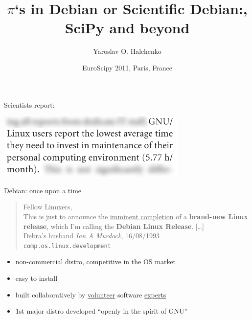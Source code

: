 \documentclass[]{beamer}
\title[$\pi$`s in Debian]%
{$\pi$`s in Debian or Scientific Debian:\newline {NumPy}, {SciPy} and beyond
}
\author[Halchenko]{Yaroslav O. Halchenko}
\institute[Debian, Dartmouth]{Debian Project,\newline Dartmouth College, USA}
\date[EuroScipy 2011]{EuroScipy 2011, Paris, France}
\begin{document}
{\SWIRLBG
\begin{frame}
  \titlepage
\end{frame}
}

\begin{frame}
\thispagestyle{empty}

Scientists report:
\begin{center}
    \includegraphics[width=0.7\textwidth]{neurolinux_paper_mainttime}\\
    {\begin{tiny}
    \end{tiny}}
\end{center}
\end{frame}

\begin{frame}{Debian: once upon a time}
  \begin{quotation}
    \noindent Fellow Linuxers,\\
    This is just to announce the \uline{imminent completion} of a
    \textbf{brand-new Linux release}, which I'm calling the \textbf{Debian
      Linux Release}.
    [\ldots] \\
    \hfill \alert{Deb}ra's husband \emph{\alert{Ian} A Murdock}, 16/08/1993 \\
    \hfill \texttt{\small comp.os.linux.development} %
  \end{quotation}
  \begin{itemize}
  \item \alert{non-commercial} distro, competitive in the OS market
  \item \alert{easy} to install
  \item built \alert{collaboratively} by \uline{volunteer} software \uline{experts}
  \item 1st major distro developed ``\alert{openly} in the spirit of GNU''
  \end{itemize}
\end{frame}
\end{document}
